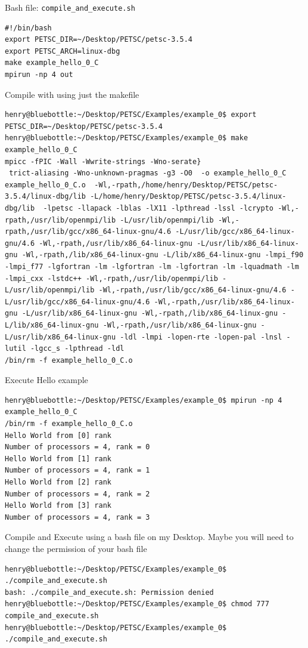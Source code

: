 \documentclass{article}
\begin{document}
\normalsize
Bash file: \verb+compile_and_execute.sh+
\scriptsize
\begin{verbatim}
#!/bin/bash  
export PETSC_DIR=~/Desktop/PETSC/petsc-3.5.4
export PETSC_ARCH=linux-dbg
make example_hello_0_C
mpirun -np 4 out
\end{verbatim}
\normalsize
Compile with using just the makefile 
\scriptsize
\begin{verbatim}
henry@bluebottle:~/Desktop/PETSC/Examples/example_0$ export PETSC_DIR=~/Desktop/PETSC/petsc-3.5.4
henry@bluebottle:~/Desktop/PETSC/Examples/example_0$ make example_hello_0_C
mpicc -fPIC -Wall -Wwrite-strings -Wno-serate}
 trict-aliasing -Wno-unknown-pragmas -g3 -O0  -o example_hello_0_C example_hello_0_C.o  -Wl,-rpath,/home/henry/Desktop/PETSC/petsc-3.5.4/linux-dbg/lib -L/home/henry/Desktop/PETSC/petsc-3.5.4/linux-dbg/lib  -lpetsc -llapack -lblas -lX11 -lpthread -lssl -lcrypto -Wl,-rpath,/usr/lib/openmpi/lib -L/usr/lib/openmpi/lib -Wl,-rpath,/usr/lib/gcc/x86_64-linux-gnu/4.6 -L/usr/lib/gcc/x86_64-linux-gnu/4.6 -Wl,-rpath,/usr/lib/x86_64-linux-gnu -L/usr/lib/x86_64-linux-gnu -Wl,-rpath,/lib/x86_64-linux-gnu -L/lib/x86_64-linux-gnu -lmpi_f90 -lmpi_f77 -lgfortran -lm -lgfortran -lm -lgfortran -lm -lquadmath -lm -lmpi_cxx -lstdc++ -Wl,-rpath,/usr/lib/openmpi/lib -L/usr/lib/openmpi/lib -Wl,-rpath,/usr/lib/gcc/x86_64-linux-gnu/4.6 -L/usr/lib/gcc/x86_64-linux-gnu/4.6 -Wl,-rpath,/usr/lib/x86_64-linux-gnu -L/usr/lib/x86_64-linux-gnu -Wl,-rpath,/lib/x86_64-linux-gnu -L/lib/x86_64-linux-gnu -Wl,-rpath,/usr/lib/x86_64-linux-gnu -L/usr/lib/x86_64-linux-gnu -ldl -lmpi -lopen-rte -lopen-pal -lnsl -
lutil -lgcc_s -lpthread -ldl  
/bin/rm -f example_hello_0_C.o
\end{verbatim}
\normalsize
Execute Hello example
\scriptsize
\begin{verbatim}
henry@bluebottle:~/Desktop/PETSC/Examples/example_0$ mpirun -np 4 example_hello_0_C
/bin/rm -f example_hello_0_C.o
Hello World from [0] rank
Number of processors = 4, rank = 0
Hello World from [1] rank
Number of processors = 4, rank = 1
Hello World from [2] rank
Number of processors = 4, rank = 2
Hello World from [3] rank
Number of processors = 4, rank = 3
\end{verbatim}
\normalsize
Compile and Execute using a bash file on my Desktop. Maybe you will need to change the permission of your bash file
\scriptsize
\begin{verbatim}
henry@bluebottle:~/Desktop/PETSC/Examples/example_0$ ./compile_and_execute.sh 
bash: ./compile_and_execute.sh: Permission denied
henry@bluebottle:~/Desktop/PETSC/Examples/example_0$ chmod 777 compile_and_execute.sh 
henry@bluebottle:~/Desktop/PETSC/Examples/example_0$ ./compile_and_execute.sh 
\end{verbatim}
\normalsize
\end{document}
